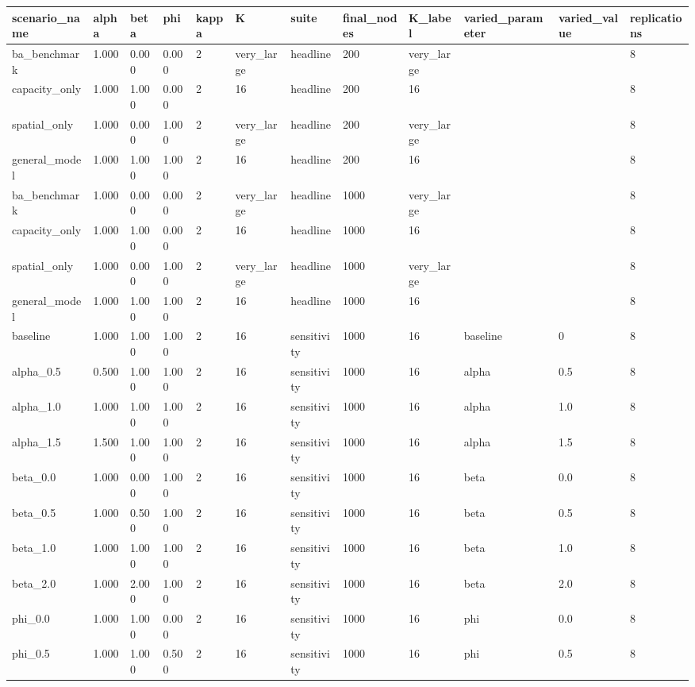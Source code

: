 \begin{tabular}{llllllllllll}
\toprule
scenario\_name & alpha & beta & phi & kappa & K & suite & final\_nodes & K\_label & varied\_parameter & varied\_value & replications \\
\midrule
ba\_benchmark & 1.000 & 0.000 & 0.000 & 2 & very\_large & headline & 200 & very\_large &  &  & 8 \\
capacity\_only & 1.000 & 1.000 & 0.000 & 2 & 16 & headline & 200 & 16 &  &  & 8 \\
spatial\_only & 1.000 & 0.000 & 1.000 & 2 & very\_large & headline & 200 & very\_large &  &  & 8 \\
general\_model & 1.000 & 1.000 & 1.000 & 2 & 16 & headline & 200 & 16 &  &  & 8 \\
ba\_benchmark & 1.000 & 0.000 & 0.000 & 2 & very\_large & headline & 1000 & very\_large &  &  & 8 \\
capacity\_only & 1.000 & 1.000 & 0.000 & 2 & 16 & headline & 1000 & 16 &  &  & 8 \\
spatial\_only & 1.000 & 0.000 & 1.000 & 2 & very\_large & headline & 1000 & very\_large &  &  & 8 \\
general\_model & 1.000 & 1.000 & 1.000 & 2 & 16 & headline & 1000 & 16 &  &  & 8 \\
baseline & 1.000 & 1.000 & 1.000 & 2 & 16 & sensitivity & 1000 & 16 & baseline & 0 & 8 \\
alpha\_0.5 & 0.500 & 1.000 & 1.000 & 2 & 16 & sensitivity & 1000 & 16 & alpha & 0.5 & 8 \\
alpha\_1.0 & 1.000 & 1.000 & 1.000 & 2 & 16 & sensitivity & 1000 & 16 & alpha & 1.0 & 8 \\
alpha\_1.5 & 1.500 & 1.000 & 1.000 & 2 & 16 & sensitivity & 1000 & 16 & alpha & 1.5 & 8 \\
beta\_0.0 & 1.000 & 0.000 & 1.000 & 2 & 16 & sensitivity & 1000 & 16 & beta & 0.0 & 8 \\
beta\_0.5 & 1.000 & 0.500 & 1.000 & 2 & 16 & sensitivity & 1000 & 16 & beta & 0.5 & 8 \\
beta\_1.0 & 1.000 & 1.000 & 1.000 & 2 & 16 & sensitivity & 1000 & 16 & beta & 1.0 & 8 \\
beta\_2.0 & 1.000 & 2.000 & 1.000 & 2 & 16 & sensitivity & 1000 & 16 & beta & 2.0 & 8 \\
phi\_0.0 & 1.000 & 1.000 & 0.000 & 2 & 16 & sensitivity & 1000 & 16 & phi & 0.0 & 8 \\
phi\_0.5 & 1.000 & 1.000 & 0.500 & 2 & 16 & sensitivity & 1000 & 16 & phi & 0.5 & 8 \\

\end{tabular}
